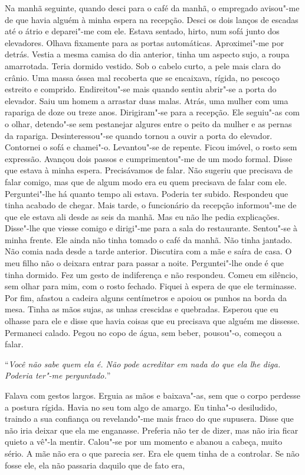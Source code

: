 Na manhã seguinte, quando desci para o café da manhã, o empregado
avisou"-me de que havia alguém à minha espera na recepção. Desci os dois
lanços de escadas até o átrio e deparei"-me com ele. Estava sentado,
hirto, num sofá junto dos elevadores. Olhava fixamente para as portas
automáticas. Aproximei"-me por detrás. Vestia a mesma camisa do dia
anterior, tinha um aspecto sujo, a roupa amarrotada. Teria dormido
vestido. Sob o cabelo curto, a pele mais clara do crânio. Uma massa
óssea mal recoberta que se encaixava, rígida, no pescoço estreito e
comprido. Endireitou"-se mais quando sentiu abrir"-se a porta do
elevador. Saiu um homem a arrastar duas malas. Atrás, uma mulher com uma
rapariga de doze ou treze anos. Dirigiram"-se para a recepção. Ele
seguiu"-as com o olhar, detendo"-se sem pestanejar algures entre o peito
da mulher e as pernas da rapariga. Desinteressou"-se quando tornou a
ouvir a porta do elevador. Contornei o sofá e chamei"-o. Levantou"-se de
repente. Ficou imóvel, o rosto sem expressão. Avançou dois passos e
cumprimentou"-me de um modo formal. Disse que estava à minha espera.
Precisávamos de falar. Não sugeriu que precisava de falar comigo, mas
que de algum modo era eu quem precisava de falar com ele. Perguntei"-lhe
há quanto tempo ali estava. Poderia ter subido. Respondeu que tinha
acabado de chegar. Mais tarde, o funcionário da recepção informou"-me de
que ele estava ali desde as seis da manhã. Mas eu não lhe pedia
explicações. Disse"-lhe que viesse comigo e dirigi"-me para a sala do
restaurante. Sentou"-se à minha frente. Ele ainda não tinha tomado o
café da manhã. Não tinha jantado. Não comia nada desde a tarde
anterior. Discutira com a mãe e saíra de casa. O meu filho não o deixara
entrar para passar a noite. Perguntei"-lhe onde é que tinha dormido. Fez
um gesto de indiferença e não respondeu. Comeu em silêncio, sem olhar
para mim, com o rosto fechado. Fiquei à espera de que ele terminasse.
Por fim, afastou a cadeira alguns centímetros e apoiou os punhos na
borda da mesa. Tinha as mãos sujas, as unhas crescidas e quebradas.
Esperou que eu olhasse para ele e disse que havia coisas que eu
precisava que alguém me dissesse. Permaneci calado. Pegou no copo de
água, sem beber, pousou"-o, começou a falar.

``\emph{Você não sabe quem ela é. Não pode acreditar em nada do que ela
lhe diga. Poderia ter"-me perguntado.}''

Falava com gestos largos. Erguia as mãos e baixava"-as, sem que o corpo
perdesse a postura rígida. Havia no seu tom algo de amargo. Eu tinha"-o
desiludido, traindo a sua confiança ou revelando"-me mais fraco do que
supusera. Disse que não iria deixar que ela me enganasse. Preferia não
ter de dizer, mas não iria ficar quieto a vê"-la mentir. Calou"-se
por um momento e abanou a cabeça, muito sério. A mãe não era o que
parecia ser. Era ele quem tinha de a controlar. Se não fosse ele, ela
não passaria daquilo que de fato era,

